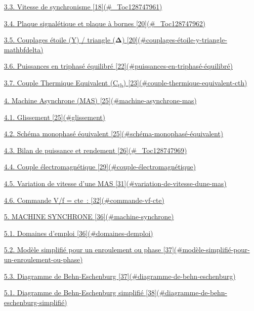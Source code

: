 \protect\hyperlink{_Toc128747961}{3.3. Vitesse de synchronisme {[}18{]}(\#\_Toc128747961)}

\protect\hyperlink{_Toc128747962}{3.4. Plaque signalétique et plaque à bornes {[}20{]}(\#\_Toc128747962)}

\protect\hyperlink{couplages-uxe9toile-y-triangle-mathbfdelta}{3.5. Couplages étoile (Y) / triangle (\(\mathbf{\Delta}\)) {[}20{]}(\#couplages-étoile-y-triangle-mathbfdelta)}

\protect\hyperlink{puissances-en-triphasuxe9-uxe9quilibruxe9}{3.6. Puissances en triphasé équilibré {[}22{]}(\#puissances-en-triphasé-équilibré)}

\protect\hyperlink{couple-thermique-equivalent-cth}{3.7. Couple Thermique Equivalent (C\textsubscript{th}) {[}23{]}(\#couple-thermique-equivalent-cth)}

\protect\hyperlink{machine-asynchrone-mas}{4. Machine Asynchrone (MAS) {[}25{]}(\#machine-asynchrone-mas)}

\protect\hyperlink{glissement}{4.1. Glissement {[}25{]}(\#glissement)}

\protect\hyperlink{schuxe9ma-monophasuxe9-uxe9quivalent}{4.2. Schéma monophasé équivalent {[}25{]}(\#schéma-monophasé-équivalent)}

\protect\hyperlink{_Toc128747969}{4.3. Bilan de puissance et rendement {[}26{]}(\#\_Toc128747969)}

\protect\hyperlink{couple-uxe9lectromagnuxe9tique}{4.4. Couple électromagnétique {[}29{]}(\#couple-électromagnétique)}

\protect\hyperlink{variation-de-vitesse-dune-mas}{4.5. Variation de vitesse d'une MAS {[}31{]}(\#variation-de-vitesse-dune-mas)}

\protect\hyperlink{commande-vf-cte}{4.6. Commande V/f = cte~: {[}32{]}(\#commande-vf-cte)}

\protect\hyperlink{machine-synchrone}{5. MACHINE SYNCHRONE {[}36{]}(\#machine-synchrone)}

\protect\hyperlink{domaines-demploi}{5.1. Domaines d'emploi {[}36{]}(\#domaines-demploi)}

\protect\hyperlink{moduxe8le-simplifiuxe9-pour-un-enroulement-ou-phase}{5.2. Modèle simplifié pour un enroulement ou phase {[}37{]}(\#modèle-simplifié-pour-un-enroulement-ou-phase)}

\protect\hyperlink{diagramme-de-behn-eschenburg}{5.3. Diagramme de Behn-Eschenburg {[}37{]}(\#diagramme-de-behn-eschenburg)}

\protect\hyperlink{diagramme-de-behn-eschenburg-simplifiuxe9}{5.1. Diagramme de Behn-Eschenburg simplifié {[}38{]}(\#diagramme-de-behn-eschenburg-simplifié)}

